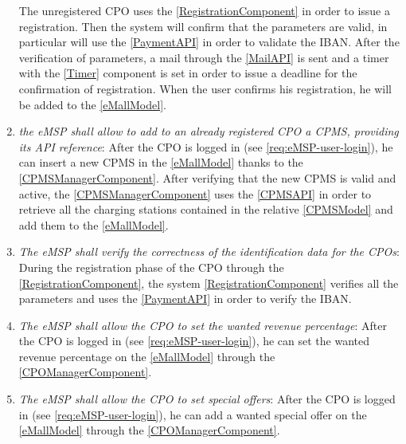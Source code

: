 \begin{enumerate}[label=\textbf{R\arabic*}]
    The unregistered \ac{CPO} uses the \ref{RegistrationComponent} in order to issue a registration. 
    Then the system will confirm that the parameters are valid, in particular will use the \ref{PaymentAPI} in order to validate the \ac{IBAN}.
    After the verification of parameters, a mail through the \ref{MailAPI} is sent and a timer with the \ref{Timer} component is set in order to issue a deadline for the confirmation of registration. 
    When the user confirms his registration, he will be added to the \ref{eMallModel}.
    \label{req:eMSP-cpo-registration}
    \item \textit{the \ac{eMSP} shall allow to add to an already registered \ac{CPO} a \ac{CPMS}, providing its \ac{API} reference}:
    After the \ac{CPO} is logged in (see \ref{req:eMSP-user-login}), he can insert a new \ac{CPMS} in the \ref{eMallModel} thanks to the \ref{CPMSManagerComponent}. After verifying that the new \ac{CPMS} is valid and active, the \ref{CPMSManagerComponent} uses the \ref{CPMSAPI} in order to retrieve all the charging stations contained in the relative \ref{CPMSModel} and add them to the \ref{eMallModel}.
    \label{req:eMSP-add-cpms}
    \item \textit{The \ac{eMSP} shall verify the correctness of the identification data for the \acp{CPO}}:
    During the registration phase of the \ac{CPO} through the \ref{RegistrationComponent}, the system \ref{RegistrationComponent} verifies all the parameters and uses the \ref{PaymentAPI} in order to verify the \ac{IBAN}.
    \label{req:eMSP-correct-cpo-info}
    \item \textit{The \ac{eMSP} shall allow the \ac{CPO} to set the wanted revenue percentage}:
    After the \ac{CPO} is logged in (see \ref{req:eMSP-user-login}), he can set the wanted revenue percentage on the \ref{eMallModel} through the \ref{CPOManagerComponent}.
    \label{req:eMSP-set-revenue}
    \item \textit{The \ac{eMSP} shall allow the \ac{CPO} to set special offers}:
    After the \ac{CPO} is logged in (see \ref{req:eMSP-user-login}), he can add a wanted special offer on the \ref{eMallModel} through the \ref{CPOManagerComponent}.

\end{enumerate}
